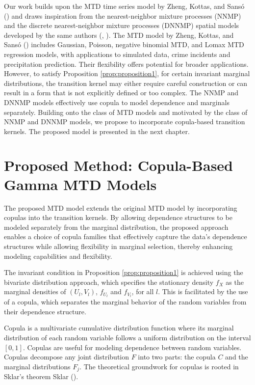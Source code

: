 \documentclass[
  letterpaper,
  double,
  12pt,
  1.0in]{beavtex}
\begin{document}
Our work builds upon the MTD time series model by Zheng, Kottas, and
Sansó () and draws inspiration
from the nearest-neighbor mixture processes (NNMP) and the discrete
nearest-neighbor mixture processes (DNNMP) spatial models developed by
the same authors (, ). The MTD model by
Zheng, Kottas, and Sansó ()
includes Gaussian, Poisson, negative binomial MTD, and Lomax MTD
regression models, with applications to simulated data, crime incidents
and precipitation prediction. Their flexibility offers potential for
broader applications. However, to satisfy Proposition
\ref{prop:proposition1}, for certain invariant marginal distributions,
the transition kernel may either require careful construction or can
result in a form that is not explicitly defined or too complex. The NNMP
and DNNMP models effectively use copula to model dependence and
marginals separately. Building onto the class of MTD models and
motivated by the class of NNMP and DNNMP models, we propose to
incorporate copula-based transition kernels. The proposed model is
presented in the next chapter.

\chapter{Proposed Method: Copula-Based Gamma MTD
Models}\label{sec-ch1-prop}

The proposed MTD model extends the original MTD model by incorporating
copulas into the transition kernels. By allowing dependence structures
to be modeled separately from the marginal distribution, the proposed
approach enables a choice of copula families that effectively capture
the data's dependence structures while allowing flexibility in marginal
selection, thereby enhancing modeling capabilities and flexibility.

The invariant condition in Proposition \ref{prop:proposition1} is
achieved using the bivariate distribution approach, which specifies the
stationary density \(f_X\) as the marginal densities of \((U_l, V_l)\),
\(f_{U_l}\) and \(f_{V_l}\), for all \(l\). This is facilitated by the
use of a copula, which separates the marginal behavior of the random
variables from their dependence structure.

Copula is a multivariate cumulative distribution function where its
marginal distribution of each random variable follows a uniform
distribution on the interval \([0, 1]\). Copulas are useful for modeling
dependence between random variables. Copulas decompose any joint
distribution \(F\) into two parts: the copula \(C\) and the marginal
distributions \(F_j\). The theoretical groundwork for copulas is rooted
in Sklar's theorem Sklar ().
\end{document}
